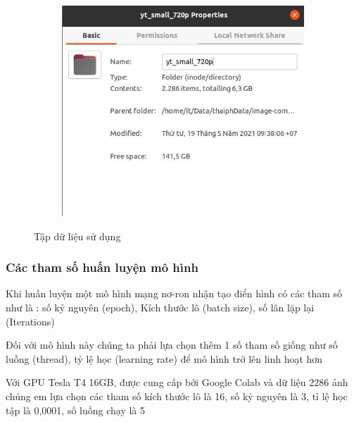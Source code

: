 \begin{figure}
    \begin{subfigure}{0.6\textwidth}
        \includegraphics[width=1.\linewidth]{Chapters/items/data.jpg}
        \caption{}
        \label{fig: data}
    \end{subfigure}
    \caption{Tập dữ liệu sử dụng}
\end{figure}

\subsubsection{Các tham số huấn luyện mô hình}
Khi huấn luyện một mô hình mạng nơ-ron nhận tạo điển hình có
các tham số như là : số kỷ nguyên (epoch), Kích thước lô (batch size),
số lân lặp lại (Iterations)

Đối với mô hình này chúng ta phải lựa chọn thêm 1 số tham số giống như
số luồng (thread), tỷ lệ học (learning rate) để mô hình trở lên linh hoạt hơn

Với GPU Tesla T4 16GB, được cung cấp bởi Google Colab và dữ liệu
2286 ảnh chúng em lựa chọn các tham số kích thước lô là 16, số kỷ nguyên là 3,
tỉ lệ học tập là 0,0001, số luồng chạy là 5

